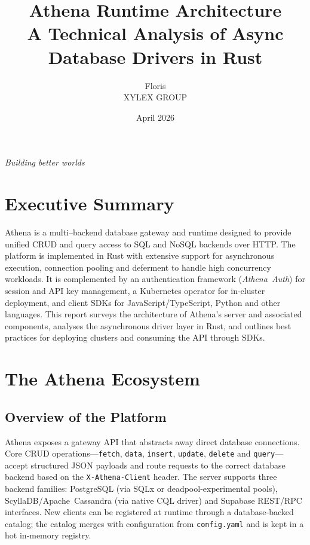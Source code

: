 \documentclass[11pt,a4paper]{article}
\title{Athena Runtime Architecture \\ \large A Technical Analysis of Async Database Drivers in Rust}
\author{Floris \\ XYLEX GROUP}
\date{April 2026}
\begin{document}
\maketitle

\begin{center}
\textit{Building better worlds}
\end{center}

\tableofcontents
\newpage

\section{Executive Summary}

Athena is a multi–backend database gateway and runtime designed to provide unified CRUD and query access to SQL and NoSQL backends over HTTP.  The platform is implemented in Rust with extensive support for asynchronous execution, connection pooling and deferment to handle high concurrency workloads.  It is complemented by an authentication framework (\emph{Athena Auth}) for session and API key management, a Kubernetes operator for in‑cluster deployment, and client SDKs for JavaScript/TypeScript, Python and other languages.  This report surveys the architecture of Athena’s server and associated components, analyses the asynchronous driver layer in Rust, and outlines best practices for deploying clusters and consuming the API through SDKs.

\section{The Athena Ecosystem}

\subsection{Overview of the Platform}

Athena exposes a gateway API that abstracts away direct database connections.  Core CRUD operations—\texttt{fetch}, \texttt{data}, \texttt{insert}, \texttt{update}, \texttt{delete} and \texttt{query}—accept structured JSON payloads and route requests to the correct database backend based on the \texttt{X‑Athena‑Client} header.  The server supports three backend families: PostgreSQL (via SQLx or deadpool‑experimental pools), ScyllaDB/Apache Cassandra (via native CQL driver) and Supabase REST/RPC interfaces.  New clients can be registered at runtime through a database‑backed catalog; the catalog merges with configuration from \texttt{config.yaml} and is kept in a hot in‑memory registry.
\end{document}
